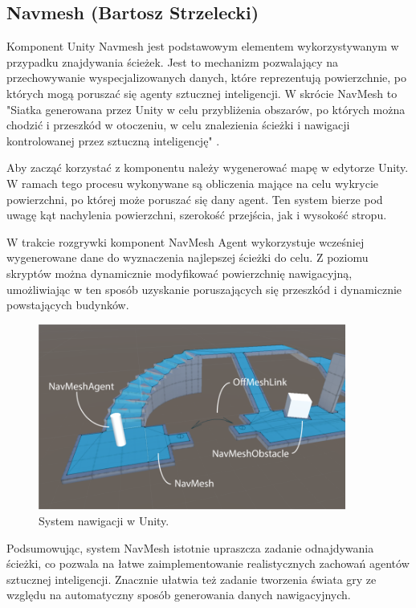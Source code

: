 \subsection{Navmesh (Bartosz Strzelecki)}\label{ss:navmesh}

Komponent Unity Navmesh jest podstawowym elementem wykorzystywanym w przypadku znajdywania ścieżek.
Jest to mechanizm pozwalający na przechowywanie wyspecjalizowanych danych, które reprezentują
powierzchnie, po których mogą poruszać się agenty sztucznej inteligencji.
W skrócie NavMesh to "Siatka generowana przez Unity w celu przybliżenia obszarów, po których można chodzić i przeszkód w
otoczeniu, w celu znalezienia ścieżki i nawigacji kontrolowanej przez sztuczną inteligencję" \cite{unity}.

Aby zacząć korzystać z komponentu należy wygenerować mapę w edytorze Unity.
W ramach tego procesu wykonywane są obliczenia mające na celu wykrycie powierzchni,
po której może poruszać się dany agent. Ten system bierze pod uwagę kąt nachylenia
powierzchni, szerokość przejścia, jak i wysokość stropu.

W trakcie rozgrywki komponent NavMesh Agent wykorzystuje wcześniej wygenerowane dane
do wyznaczenia najlepszej ścieżki do celu. Z poziomu skryptów można dynamicznie modyfikować powierzchnię
nawigacyjną, umożliwiając w ten sposób uzyskanie poruszających się przeszkód i dynamicznie powstających budynków.

\begin{figure}[h!]
    \centering
    \includegraphics[width=0.9\textwidth]{images/navmesh.png}
    \caption{System nawigacji w Unity.}
\end{figure}

Podsumowując, system NavMesh istotnie upraszcza zadanie odnajdywania ścieżki, co pozwala na łatwe zaimplementowanie
realistycznych zachowań agentów sztucznej inteligencji. Znacznie ułatwia też zadanie tworzenia świata gry ze względu na automatyczny
sposób generowania danych nawigacyjnych.

